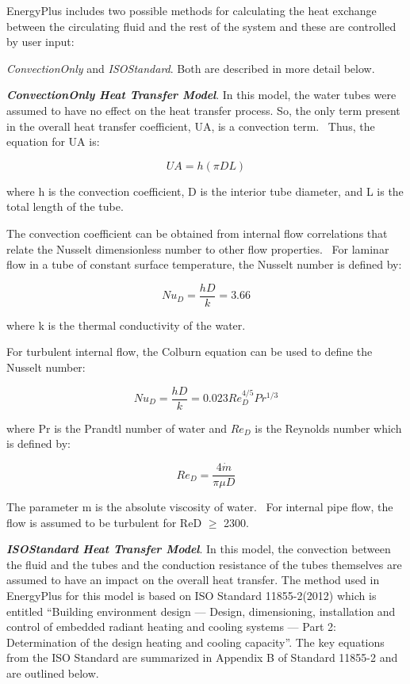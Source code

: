 EnergyPlus includes two possible methods for calculating the heat exchange between the circulating fluid and the rest of the system and these are controlled by user input: {\emph{ConvectionOnly} and \emph{ISOStandard}.  Both are described in more detail below.

\textbf{\emph{ConvectionOnly Heat Transfer Model}}.  In this model, the water tubes were assumed to have no effect on the heat transfer process.  So, the only term present in the overall heat transfer coefficient, UA, is a convection term.~ Thus, the equation for UA is:

\begin{equation}
UA = h\left( {\pi DL} \right)
\end{equation}

where h is the convection coefficient, D is the interior tube diameter, and L is the total length of the tube.

The convection coefficient can be obtained from internal flow correlations that relate the Nusselt dimensionless number to other flow properties.~ For laminar flow in a tube of constant surface temperature, the Nusselt number is defined by:

\begin{equation}
N{u_D} = \frac{{hD}}{k} = 3.66
\end{equation}

where k is the thermal conductivity of the water.

For turbulent internal flow, the Colburn equation can be used to define the Nusselt number:

\begin{equation}
N{u_D} = \frac{{hD}}{k} = 0.023{Re_D^{4/5}}{Pr^{1/3}}
\end{equation}

where Pr is the Prandtl number of water and \(Re_D\) is the Reynolds number which is defined by:

\begin{equation}
{Re_D} = \frac{{4\dot m}}{{\pi \mu D}}
\label{eq:RadSysHXReD681}
\end{equation}

The parameter m is the absolute viscosity of water.~ For internal pipe flow, the flow is assumed to be turbulent for ReD \(\geq\) 2300.

\textbf{\emph{ISOStandard Heat Transfer Model}}.  In this model, the convection between the fluid and the tubes and the conduction resistance of the tubes themselves are assumed to have an impact on the overall heat transfer.  The method used in EnergyPlus for this model is based on ISO Standard 11855-2(2012) which is entitled ``Building environment design — Design, dimensioning, installation and control of embedded radiant heating and cooling systems — Part 2: Determination of the design heating and cooling capacity''.  The key equations from the ISO Standard are summarized in Appendix B of Standard 11855-2 and are outlined below.

}
